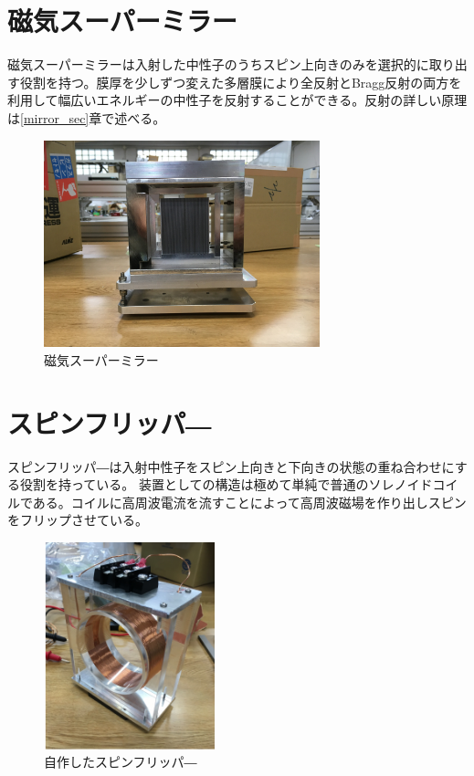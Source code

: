 \section{磁気スーパーミラー}
磁気スーパーミラーは入射した中性子のうちスピン上向きのみを選択的に取り出す役割を持つ。膜厚を少しずつ変えた多層膜により全反射とBragg反射の両方を利用して幅広いエネルギーの中性子を反射することができる。反射の詳しい原理は\ref{mirror_sec}章で述べる。
\begin{figure}[H]
\centering
\includegraphics[width=8cm]{device/mirrorphoto.jpg}\caption{磁気スーパーミラー}
\end{figure}


\section{スピンフリッパ―}
スピンフリッパ―は入射中性子をスピン上向きと下向きの状態の重ね合わせにする役割を持っている。
装置としての構造は極めて単純で普通のソレノイドコイルである。コイルに高周波電流を流すことによって高周波磁場を作り出しスピンをフリップさせている。
\begin{figure}[H]
\centering
\includegraphics[width=5cm,height=6cm]{device/spinflipperphoto.pdf}\caption{自作したスピンフリッパ―}
\end{figure}



